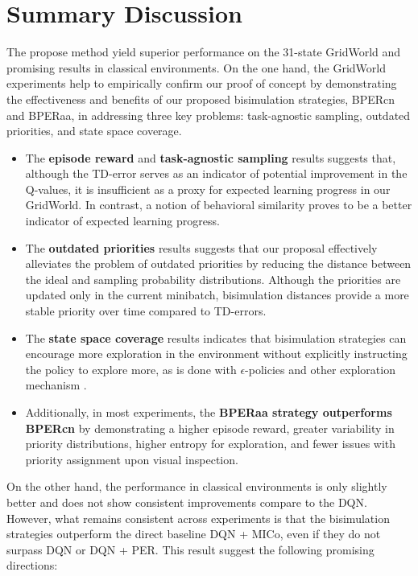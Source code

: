 \section{Summary Discussion}
\label{sec:summary_discussion}

The propose method yield superior performance on the 31-state GridWorld and promising results in classical environments. On the one hand, the GridWorld experiments help to empirically confirm our proof of concept by demonstrating the effectiveness and benefits of our proposed bisimulation strategies, BPERcn and BPERaa, in addressing three key problems: task-agnostic sampling, outdated priorities, and state space coverage.

\begin{itemize}
    \item The \textbf{episode reward} and \textbf{task-agnostic sampling} results suggests that, although the TD-error serves as an indicator of potential improvement in the Q-values, it is insufficient as a proxy for expected learning progress in our GridWorld. In contrast, a notion of behavioral similarity proves to be a better indicator of expected learning progress.
    \item The \textbf{outdated priorities} results suggests that our proposal effectively alleviates the problem of outdated priorities by reducing the distance between the ideal and sampling probability distributions. Although the priorities are updated only in the current minibatch, bisimulation distances provide a more stable priority over time compared to TD-errors.
    \item The \textbf{state space coverage} results indicates that bisimulation strategies can encourage more exploration in the environment without explicitly instructing the policy to explore more, as is done with $\epsilon$-policies and other exploration mechanism \cite{amin2021survey,ladosz2022exploration}.
    \item Additionally, in most experiments, the \textbf{BPERaa strategy outperforms BPERcn} by demonstrating a higher episode reward, greater variability in priority distributions, higher entropy for exploration, and fewer issues with priority assignment upon visual inspection.
\end{itemize}

On the other hand, the performance in classical environments is only slightly better and does not show consistent improvements compare to the DQN. However, what remains consistent across experiments is that the bisimulation strategies outperform the direct baseline DQN + MICo, even if they do not surpass DQN or DQN + PER. This result suggest the following promising directions:

